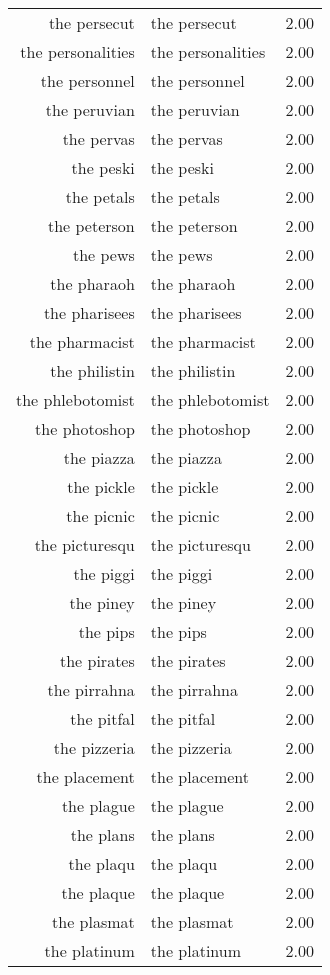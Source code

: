 \begin{table}[ht]
\begin{tabular}{rlr}
  the persecut & the persecut & 2.00 \\ 
  the personalities & the personalities & 2.00 \\ 
  the personnel & the personnel & 2.00 \\ 
  the peruvian & the peruvian & 2.00 \\ 
  the pervas & the pervas & 2.00 \\ 
  the peski & the peski & 2.00 \\ 
  the petals & the petals & 2.00 \\ 
  the peterson & the peterson & 2.00 \\ 
  the pews & the pews & 2.00 \\ 
  the pharaoh & the pharaoh & 2.00 \\ 
  the pharisees & the pharisees & 2.00 \\ 
  the pharmacist & the pharmacist & 2.00 \\ 
  the philistin & the philistin & 2.00 \\ 
  the phlebotomist & the phlebotomist & 2.00 \\ 
  the photoshop & the photoshop & 2.00 \\ 
  the piazza & the piazza & 2.00 \\ 
  the pickle & the pickle & 2.00 \\ 
  the picnic & the picnic & 2.00 \\ 
  the picturesqu & the picturesqu & 2.00 \\ 
  the piggi & the piggi & 2.00 \\ 
  the piney & the piney & 2.00 \\ 
  the pips & the pips & 2.00 \\ 
  the pirates & the pirates & 2.00 \\ 
  the pirrahna & the pirrahna & 2.00 \\ 
  the pitfal & the pitfal & 2.00 \\ 
  the pizzeria & the pizzeria & 2.00 \\ 
  the placement & the placement & 2.00 \\ 
  the plague & the plague & 2.00 \\ 
  the plans & the plans & 2.00 \\ 
  the plaqu & the plaqu & 2.00 \\ 
  the plaque & the plaque & 2.00 \\ 
  the plasmat & the plasmat & 2.00 \\ 
  the platinum & the platinum & 2.00 \\ 

\end{tabular}
\end{table}
